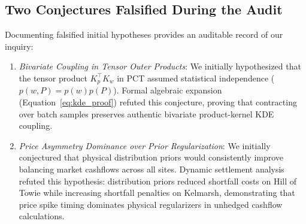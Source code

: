\subsection{Two Conjectures Falsified During the Audit}
Documenting falsified initial hypotheses provides an auditable record of our inquiry:
\begin{enumerate}[leftmargin=*]
\item \textit{Bivariate Coupling in Tensor Outer Products}: We initially hypothesized that the tensor product $K_p^\top K_w$ in PCT assumed statistical independence ($p(w, P) = p(w)p(P)$). Formal algebraic expansion (Equation~\eqref{eq:kde_proof}) refuted this conjecture, proving that contracting over batch samples preserves authentic bivariate product-kernel KDE coupling.
\item \textit{Price Asymmetry Dominance over Prior Regularization}: We initially conjectured that physical distribution priors would consistently improve balancing market cashflows across all sites. Dynamic settlement analysis refuted this hypothesis: distribution priors reduced shortfall costs on Hill of Towie while increasing shortfall penalties on Kelmarsh, demonstrating that price spike timing dominates physical regularizers in unhedged cashflow calculations.
\end{enumerate}

